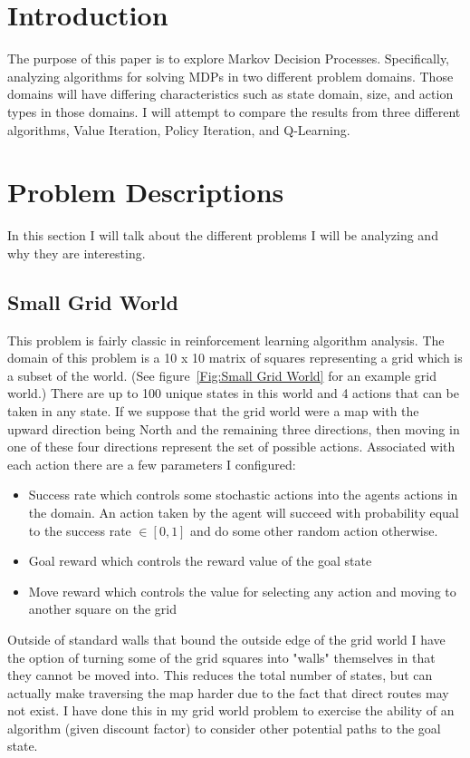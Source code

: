 \documentclass[11pt]{article}
\newcommand{\problemone}{Small Grid World}
\begin{document}
    \thispagestyle{firstpage}


    \section{Introduction}\label{sec:introduction}
    The purpose of this paper is to explore Markov Decision Processes.
    Specifically, analyzing algorithms for solving MDPs in two different problem domains.
    Those domains will have differing characteristics such as state domain, size, and action types in those domains.
    I will attempt to compare the results from three different algorithms, Value Iteration, Policy Iteration, and Q-Learning.


    \section{Problem Descriptions}
    In this section I will talk about the different problems I will be analyzing and why they are interesting.
    \subsection{\problemone}
    This problem is fairly classic in reinforcement learning algorithm analysis.
    The domain of this problem is a 10 x 10 matrix of squares representing a grid which is a subset of the world.
    (See figure~\ref{Fig:Small Grid World} for an example grid world.)
    There are up to 100 unique states in this world and 4 actions that can be taken in any state.
    If we suppose that the grid world were a map with the upward direction being North and the remaining three directions,
    then moving in one of these four directions represent the set of possible actions.
    Associated with each action there are a few parameters I configured:
    \begin{itemize}
        \item Success rate which controls some stochastic actions into the agents actions in the domain. An action taken by the agent will succeed with probability equal to the success rate $\in [0,1]$ and do some other random action otherwise.
        \item Goal reward which controls the reward value of the goal state
        \item Move reward which controls the value for selecting any action and moving to another square on the grid
    \end{itemize}
    Outside of standard walls that bound the outside edge of the grid world I have the option of turning some of the grid
    squares into "walls" themselves in that they cannot be moved into.
    This reduces the total number of states, but can actually make traversing the map harder due to the fact that direct
    routes may not exist.
    I have done this in my grid world problem to exercise the ability of an algorithm (given discount factor) to consider
    other potential paths to the goal state.
\end{document}
